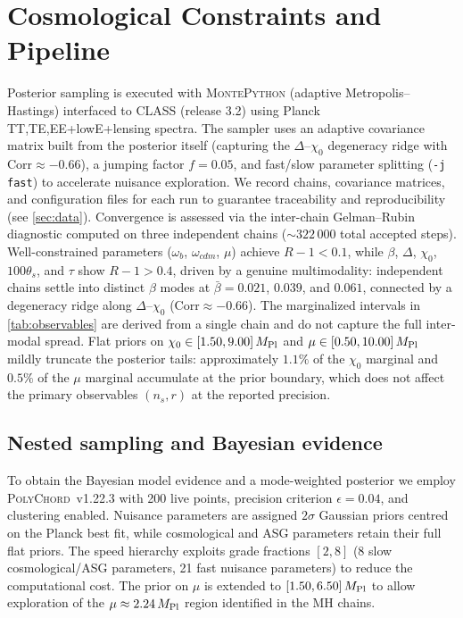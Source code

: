 \documentclass[11pt,a4paper]{article}
\begin{document}
\section{Cosmological Constraints and Pipeline}
\label{sec:constraints}
Posterior sampling is executed with \textsc{MontePython} (adaptive Metropolis--Hastings) interfaced to \textsc{CLASS} (release 3.2) using Planck TT,TE,EE+lowE+lensing spectra. The sampler uses an adaptive covariance matrix built from the posterior itself (capturing the $\Delta$--$\chi_0$ degeneracy ridge with $\mathrm{Corr}\approx-0.66$), a jumping factor $f=0.05$, and fast/slow parameter splitting (\texttt{-j fast}) to accelerate nuisance exploration. We record chains, covariance matrices, and configuration files for each run to guarantee traceability and reproducibility (see \cref{sec:data}). Convergence is assessed via the inter-chain Gelman--Rubin diagnostic computed on three independent chains (${\sim}322\,000$ total accepted steps). Well-constrained parameters ($\omega_b$, $\omega_{cdm}$, $\mu$) achieve $R{-}1<0.1$, while $\beta$, $\Delta$, $\chi_0$, $100\theta_s$, and $\tau$ show $R{-}1>0.4$, driven by a genuine multimodality: independent chains settle into distinct $\beta$ modes at $\bar\beta=0.021$, $0.039$, and $0.061$, connected by a degeneracy ridge along $\Delta$--$\chi_0$ ($\mathrm{Corr}\approx-0.66$). The marginalized intervals in \cref{tab:observables} are derived from a single chain and do not capture the full inter-modal spread. Flat priors on $\chi_0\in[1.50,9.00]\,M_{\rm Pl}$ and $\mu\in[0.50,10.00]\,M_{\rm Pl}$ mildly truncate the posterior tails: approximately $1.1\%$ of the $\chi_0$ marginal and $0.5\%$ of the $\mu$ marginal accumulate at the prior boundary, which does not affect the primary observables $(n_s,r)$ at the reported precision.

\subsection{Nested sampling and Bayesian evidence}
\label{sec:evidence}
To obtain the Bayesian model evidence and a mode-weighted posterior we employ \textsc{PolyChord}~v1.22.3 \cite{Handley2015a,Handley2015b} with 200 live points, precision criterion $\epsilon=0.04$, and clustering enabled. Nuisance parameters are assigned $2\sigma$ Gaussian priors centred on the Planck best fit, while cosmological and ASG parameters retain their full flat priors. The speed hierarchy exploits grade fractions $[2,8]$ (8 slow cosmological/ASG parameters, 21 fast nuisance parameters) to reduce the computational cost. The prior on $\mu$ is extended to $[1.50,6.50]\,M_{\rm Pl}$ to allow exploration of the $\mu\approx2.24\,M_{\rm Pl}$ region identified in the MH chains.
\end{document}
